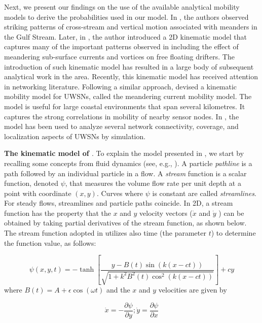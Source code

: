 Next, we present our findings on the use of the available analytical mobility models to derive the probabilities used in our model.
In \cite{bower1989evidence}, the authors observed striking patterns of cross-stream and vertical motion associated with meanders in the Gulf Stream.
Later, in \cite{bower1991simple}, the author introduced a 2D kinematic model that captures many of the important patterns observed in \cite{bower1989evidence} including the effect of meandering sub-surface currents and vortices on free floating drifters.
The introduction of such kinematic model has resulted in a large body of subsequent analytical work in the area.
Recently, this kinematic model has received attention in networking literature.
Following a similar approach, \cite{caruso2008meandering} devised a kinematic mobility model for UWSNs, called the meandering current mobility model.
The model is useful for large coastal environments that span several kilometres.
It captures the strong correlations in mobility of nearby sensor nodes.
In \cite{caruso2008meandering}, the model has been used to analyze several network connectivity, coverage, and localization aspects of UWSNs by simulation.

\textbf{The kinematic model of \cite{caruso2008meandering}}. To explain the model presented in \cite{caruso2008meandering}, we start by recalling some concepts from fluid dynamics (see, e.g., \cite{yunus2013fluid}).
A particle \textit{pathline} is a path followed by an individual particle in a flow.
A \textit{stream} function is a scalar function, denoted  $\psi$, that measures the volume flow rate per unit depth at a point with coordinate $(x,y)$.
Curves where $\psi$ is constant are called \textit{streamlines}.
For steady flows, streamlines and particle paths coincide.
In 2D, a stream function has the property that the $x$ and $y$ velocity vectors ($\dot{x}$ and $\dot{y}$ ) can be obtained by taking partial derivatives of the stream function, as shown below.
The stream function adopted in \cite{caruso2008meandering} utilizes also time (the parameter $t$) to determine the function value, as follows:

\begin{equation}\label{eq:sf}
\psi(x,y,t)=-\tanh{[\frac{y-B(t)\sin(k(x-ct))}{\sqrt{1 + k^2 B^2(t) \cos^2(k(x-ct))}} ]} + cy
\end{equation}
 where $  B(t) = A + \epsilon \cos(\omega t)$  and the $x$ and $y$ velocities are given by
 
 \begin{equation}\label{eq:lf}
\dot{x}=-\frac{\partial \psi}{\partial y} ; \dot{y}=\frac{\partial \psi}{\partial x}
\end{equation}


